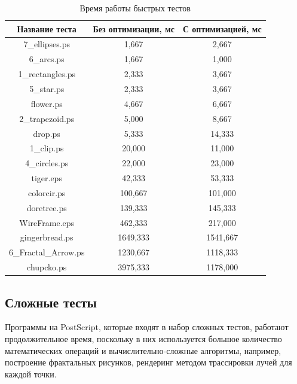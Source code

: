 \begin{table}[H]
	\small
	\begin{center}
	\begin{tabular}{|c|c|c|}
		\hline \textbf{Название теста} & \textbf{Без оптимизации, мс} & \textbf{С оптимизацией, мс}\\
		\hline 7\_ellipses.ps & 1,667 &  2,667\\
		\hline 6\_arcs.ps & 1,667 & 1,000\\
		\hline 1\_rectangles.ps & 2,333 & 3,667\\
		\hline 5\_star.ps &  2,333 & 3,667\\
		\hline flower.ps & 4,667 & 6,667\\
		\hline 2\_trapezoid.ps & 5,000 & 8,667\\
		\hline drop.ps & 5,333 & 14,333\\
		\hline 1\_clip.ps & 20,000 & 11,000\\
		\hline 4\_circles.ps & 22,000 & 23,000\\
		\hline tiger.eps & 42,333 & 53,333\\
		\hline colorcir.ps & 100,667 & 101,000\\
		\hline doretree.ps & 139,333 & 145,333\\
		\hline WireFrame.eps &  462,333 &  217,000\\
		\hline gingerbread.ps & 1649,333 & 1541,667\\
		\hline 6\_Fractal\_Arrow.ps &  1230,667 & 1118,333\\
		\hline chupcko.ps & 3975,333 &  1178,000\\
		\hline 					
	\end{tabular}
	\end{center}
	\caption{\label{tab:fast-tests}Время работы быстрых тестов}
\end{table}


	\subsection*{Сложные тесты}
	Программы на PostScript, которые входят в набор сложных тестов, работают продолжительное время, поскольку в них используется большое количество математических операций и вычислительно-сложные алгоритмы, например, построение фрактальных рисунков, рендеринг методом трассировки лучей для каждой точки.
	
